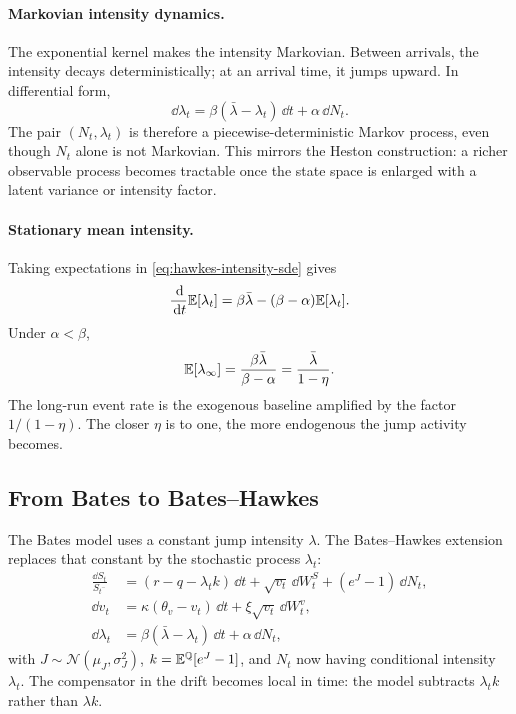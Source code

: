 \paragraph{Markovian intensity dynamics.}
The exponential kernel makes the intensity Markovian. Between arrivals, the intensity decays deterministically; at an arrival time, it jumps upward. In differential form,
\begin{equation}\label{eq:hawkes-intensity-sde}
    \dd\lambda_t
    =
    \beta(\bar{\lambda}-\lambda_t)\,\dd t+\alpha\,\dd N_t.
\end{equation}
The pair \((N_t,\lambda_t)\) is therefore a piecewise-deterministic Markov process, even though \(N_t\) alone is not Markovian. This mirrors the Heston construction: a richer observable process becomes tractable once the state space is enlarged with a latent variance or intensity factor.

\paragraph{Stationary mean intensity.}
Taking expectations in \eqref{eq:hawkes-intensity-sde} gives
\begin{equation}
    \frac{\,\mathrm{d}}{\,\mathrm{d} t}\mathbb{E}[\lambda_t]
    =
    \beta\bar{\lambda}-(\beta-\alpha)\mathbb{E}[\lambda_t].
\end{equation}
Under \(\alpha<\beta\),
\begin{equation}
    \mathbb{E}[\lambda_\infty]
    =
    \frac{\beta\bar{\lambda}}{\beta-\alpha}
    =
    \frac{\bar{\lambda}}{1-\eta}.
\end{equation}
The long-run event rate is the exogenous baseline amplified by the factor \(1/(1-\eta)\). The closer \(\eta\) is to one, the more endogenous the jump activity becomes.
\subsection{From Bates to Bates--Hawkes}
\label{sec:bh-dynamics}

The Bates model uses a constant jump intensity \(\lambda\). The Bates--Hawkes extension replaces that constant by the stochastic process \(\lambda_t\):
\begin{align}
    \frac{\dd S_t}{S_{t^-}}
    &=
    (r-q-\lambda_t k)\,\dd t
    +\sqrt{v_t}\,\dd W_t^S
    +(e^J-1)\,\dd N_t,\\
    \dd v_t
    &=
    \kappa(\theta_v-v_t)\,\dd t+\xi\sqrt{v_t}\,\dd W_t^v,\\
    \dd\lambda_t
    &=
    \beta(\bar{\lambda}-\lambda_t)\,\dd t+\alpha\,\dd N_t,
\end{align}
with \(J\sim\mathcal{N}(\mu_J,\sigma_J^2)\), \(k=\mathbb{E}^{\mathbb{Q}}[e^J-1]\), and \(N_t\) now having conditional intensity \(\lambda_t\). The compensator in the drift becomes local in time: the model subtracts \(\lambda_t k\) rather than \(\lambda k\).

